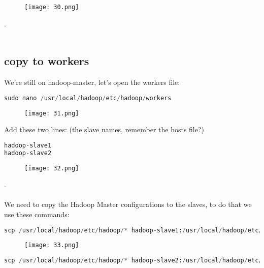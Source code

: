 \documentclass[onecolumn]{article}
\begin{document}
\begin{figure}[ht!]
\centering
\texttt{[image: 30.png]}
\caption{\label{}}
\end{figure}
.\\\\
\subsection{copy to workers}

We’re still on hadoop-master, let’s open the workers file:

\begin{lstlisting}[language=Python, caption= a ]
sudo nano /usr/local/hadoop/etc/hadoop/workers
\end{lstlisting}

\begin{figure}[ht!]
\centering
\texttt{[image: 31.png]}
\caption{\label{}}
\end{figure}





Add these two lines: (the slave names, remember the hosts file?)

\begin{lstlisting}[language=Python, caption= a ]
hadoop-slave1
hadoop-slave2
\end{lstlisting}

\begin{figure}[ht!]
\centering
\texttt{[image: 32.png]}
\caption{\label{}}
\end{figure}
.\\\\
We need to copy the Hadoop Master configurations to the slaves, to do that we use these commands:

\begin{lstlisting}[language=Python, caption= a ]
scp /usr/local/hadoop/etc/hadoop/* hadoop-slave1:/usr/local/hadoop/etc/hadoop//
\end{lstlisting}

\begin{figure}[ht!]
\centering
\texttt{[image: 33.png]}
\caption{\label{}}
\end{figure}

\begin{lstlisting}[language=Python, caption= a ]
scp /usr/local/hadoop/etc/hadoop/* hadoop-slave2:/usr/local/hadoop/etc/hadoop/
\end{lstlisting}
\end{document}
